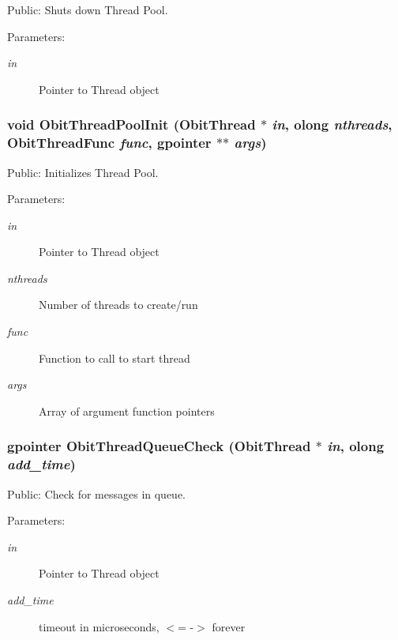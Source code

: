 Public: Shuts down Thread Pool. 

\begin{Desc}
\item[Parameters:]
\begin{description}
\item[{\em in}]Pointer to Thread object \end{description}
\end{Desc}
\subsubsection{\setlength{\rightskip}{0pt plus 5cm}void Obit\-Thread\-Pool\-Init ({\bf Obit\-Thread} $\ast$ {\em in}, {\bf olong} {\em nthreads}, {\bf Obit\-Thread\-Func} {\em func}, gpointer $\ast$$\ast$ {\em args})}\label{ObitThread_8c_a22}


Public: Initializes Thread Pool. 

\begin{Desc}
\item[Parameters:]
\begin{description}
\item[{\em in}]Pointer to Thread object \item[{\em nthreads}]Number of threads to create/run \item[{\em func}]Function to call to start thread \item[{\em args}]Array of argument function pointers \end{description}
\end{Desc}
\subsubsection{\setlength{\rightskip}{0pt plus 5cm}gpointer Obit\-Thread\-Queue\-Check ({\bf Obit\-Thread} $\ast$ {\em in}, {\bf olong} {\em add\_\-time})}\label{ObitThread_8c_a29}


Public: Check for messages in queue. 

\begin{Desc}
\item[Parameters:]
\begin{description}
\item[{\em in}]Pointer to Thread object \item[{\em add\_\-time}]timeout in microseconds, $<$= -$>$ forever \end{description}
\end{Desc}
